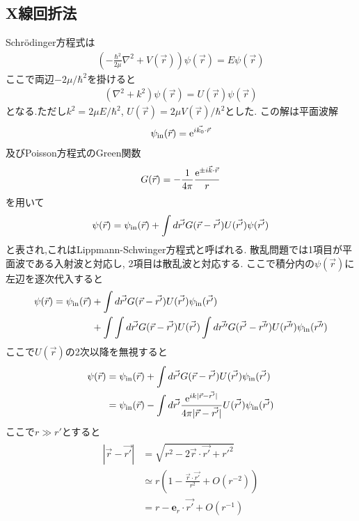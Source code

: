 \subsection{X線回折法}
Schr\"{o}dinger方程式は
\begin{align}
  \left(-\frac{\hbar^2}{2\mu}\nabla^2+V(\vec{r})\right)\psi(\vec{r})=E\psi(\vec{r})
\end{align}
ここで両辺$-2\mu/\hbar^2$を掛けると
\begin{align}
  (\nabla^2+k^2)\psi(\vec{r})=U(\vec{r})\psi(\vec{r})
\end{align}
となる.ただし$k^2=2\mu E/\hbar^2$, $U(\vec{r})=2\mu V(\vec{r})/\hbar^2$とした.
この解は平面波解
\begin{align}
  \psi_{\rm in}(\vec{r})={\rm e}^{i\vec{k_0}\cdot\vec{r}}
\end{align}
及びPoisson方程式のGreen関数
\begin{align}
  G(\vec{r})=-\frac{1}{4\pi}\frac{{\rm e}^{\pm i\vec{k}\cdot\vec{r}}}{r}
\end{align}
を用いて
\begin{align}
  \psi(\vec{r})=\psi_{\rm in}(\vec{r})+\int d\vec{r'}G(\vec{r}-\vec{r'})U(\vec{r'})\psi(\vec{r'})
\end{align}
と表され,これはLippmann-Schwinger方程式と呼ばれる.
散乱問題では1項目が平面波である入射波と対応し,
2項目は散乱波と対応する.
ここで積分内の$\psi(\vec{r})$に左辺を逐次代入すると
\begin{align}
  \begin{split}
    \psi(\vec{r})=\psi_{\rm in}(\vec{r})&+\int d\vec{r'}G(\vec{r}-\vec{r'})U(\vec{r'})\psi_{\rm in}(\vec{r'})\\
    &+\int\int d\vec{r'}G(\vec{r}-\vec{r'})U(\vec{r'})\int d\vec{r''}G(\vec{r'}-\vec{r''})U(\vec{r''})\psi_{\rm in}(\vec{r''})\\
  \end{split}
\end{align}
ここで$U(\vec{r})$の2次以降を無視すると
\begin{align}
  \begin{split}
    \psi(\vec{r})&=\psi_{\rm in}(\vec{r})+\int d\vec{r'}G(\vec{r}-\vec{r'})U(\vec{r'})\psi_{\rm in}(\vec{r'})\\
    &=\psi_{\rm in}(\vec{r})-\int d\vec{r'}\frac{{\rm e}^{ik|\vec{r}-\vec{r'}|}}{4\pi|\vec{r}-\vec{r'}|}U(\vec{r'})\psi_{\rm in}(\vec{r'})
  \end{split}
\end{align}
ここで$r\gg r'$とすると
\begin{align}
  \begin{split}
    |\vec{r}-\vec{r'}|&=\sqrt{r^2-2\vec{r}\cdot\vec{r'}+r'^2}\\
    &\simeq r\left(1-\frac{\vec{r}\cdot\vec{r'}}{r^2}+O\left(r^{-2}\right)\right)\\
    &=r-\bm{e}_r\cdot\vec{r'}+O\left(r^{-1}\right)
  \end{split}
\end{align}
